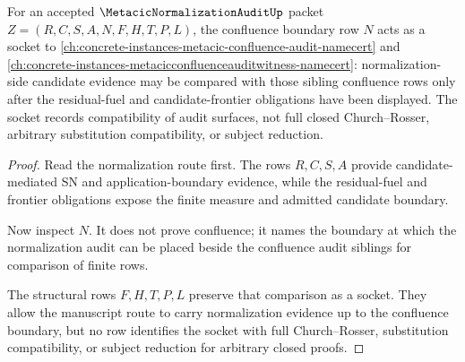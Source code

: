 \begin{theorem}
\label{thm:metacic-normalization-audit-confluence-socket}
For an accepted $\MetacicNormalizationAuditUp$ packet $Z=(R,C,S,A,N,F,H,T,P,L)$, the confluence boundary row $N$ acts as a socket to \autoref{ch:concrete-instances-metacic-confluence-audit-namecert} and \autoref{ch:concrete-instances-metacicconfluenceauditwitness-namecert}: normalization-side candidate evidence may be compared with those sibling confluence rows only after the residual-fuel and candidate-frontier obligations have been displayed. The socket records compatibility of audit surfaces, not full closed Church--Rosser, arbitrary substitution compatibility, or subject reduction.
\end{theorem}
\begin{proof}
Read the normalization route first. The rows $R,C,S,A$ provide candidate-mediated SN and application-boundary evidence, while the residual-fuel and frontier obligations expose the finite measure and admitted candidate boundary.

Now inspect $N$. It does not prove confluence; it names the boundary at which the normalization audit can be placed beside the confluence audit siblings for comparison of finite rows.

The structural rows $F,H,T,P,L$ preserve that comparison as a socket. They allow the manuscript route to carry normalization evidence up to the confluence boundary, but no row identifies the socket with full Church--Rosser, substitution compatibility, or subject reduction for arbitrary closed proofs.
\end{proof}

